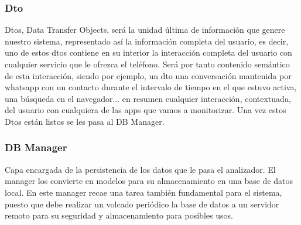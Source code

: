 \documentclass[12pt,a4paper,oneside]{book} %
\begin{document}
\subsubsection{Dto}
Dtos, Data Transfer Objects, será la unidad última de información que genere nuestro sistema, representado así la información completa del usuario, es decir, uno de estos dtos contiene en su interior la interacción completa del usuario con cualquier servicio que le ofrezca el teléfono. 
\newline
\newline
Será por tanto contenido semántico de esta interacción, siendo por ejemplo, un dto una conversación mantenida por whatsapp con un contacto durante el intervalo de tiempo en el que estuvo activa, una búsqueda en el navegador... en resumen cualquier interacción, contextuada, del usuario con cualquiera de las apps que vamos a monitorizar. 
\newline
\newline 
Una vez estos Dtos están listos se les pasa al DB Manager. 
\subsubsection{DB Manager}
Capa encargada de la persistencia de los datos que le pasa el analizador. El manager los convierte en modelos para su almacenamiento en una base de datos local. 
\newline 
\newline 
En este manager recae una tarea también fundamental para el sistema, puesto que debe realizar un volcado periódico la base de datos a un servidor remoto para su seguridad y almacenamiento para posibles usos. 
\newpage
\end{document}
